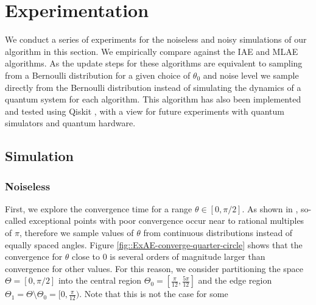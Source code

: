 \section{Experimentation}
We conduct a series of experiments for the noiseless and noisy simulations of our algorithm in this section. We empirically compare against the IAE and MLAE algorithms. As the update steps for these algorithms are equivalent to sampling from a Bernoulli distribution for a given choice of $\theta_0$ and noise level we sample directly from the Bernoulli distribution instead of simulating the dynamics of a quantum system for each algorithm. This algorithm has also been implemented and tested using Qiskit \cite{Qiskit}, with a view for future experiments with quantum simulators and quantum hardware.


\subsection{Simulation}
\subsubsection{Noiseless}
First, we explore the convergence time for a range $\theta \in [0, \pi/2]$. As shown in \cite{callison_2022_amp_with_jitter}, so-called exceptional points with poor convergence occur near to rational multiples of $\pi$, therefore we sample values of $\theta$ from continuous distributions instead of equally spaced angles. Figure \ref{fig::ExAE-converge-quarter-circle} shows that the convergence for $\theta$ close to $0$ is several orders of magnitude larger than convergence for other values. For this reason, we consider partitioning the space $\Theta = [0, \pi/2]$ into the central region $\Theta_0 = [\frac{\pi}{12}, \frac{5 \pi}{12}]$ and the edge region $\Theta_1 = \Theta \setminus \Theta_0 = [0, \frac{\pi}{12})$. Note that this is not the case for some

